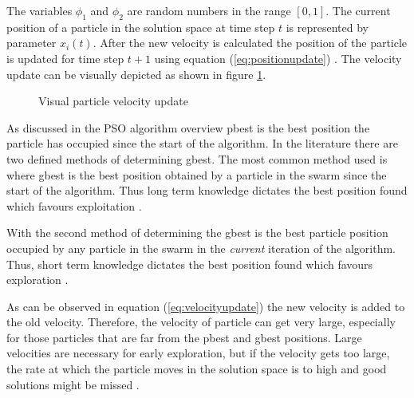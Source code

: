 The variables $\phi_1$ and $\phi_2$ are random numbers in the range $[0,1]$. The current position of a particle in the solution space at time step $t$ is represented by parameter $x_i(t)$\cite{FundamentalSwarm,CompuIntelligenceIntro}. After the new velocity is calculated the position of the particle is updated for time step $t+1$ using equation (\ref{eq:positionupdate}) \cite{FundamentalSwarm,CompuIntelligenceIntro}. The velocity update can be visually depicted as shown in figure \ref{fig:particleVelocityUpdate}. 
\begin{figure}[h]
	\begin{centering}
	
	\caption{Visual particle velocity update \cite{SOSwarm,FundamentalSwarm,CompuIntelligenceIntro,PSOSelfHierarch}}

	\label{fig:particleVelocityUpdate}
	\end{centering}
\end{figure}

As discussed in the PSO algorithm overview pbest is the best position the particle has occupied since the start of the algorithm. In the literature there are two defined methods of determining gbest. The most common method used is where gbest is the best position obtained by a particle in the swarm since the start of the algorithm. Thus long term knowledge dictates the best position found which favours exploitation \cite{CompuIntelligenceIntro,FundamentalSwarm}.

With the second method of determining the gbest is the best particle position occupied by any particle in the swarm in the \emph{current} iteration of the algorithm. Thus, short term knowledge dictates the best position found which favours exploration \cite{CompuIntelligenceIntro,FundamentalSwarm}.

As can be observed in equation (\ref{eq:velocityupdate}) the new velocity is added to the old velocity. Therefore, the velocity of particle can get very large, especially for those particles that are far from the pbest and gbest positions. Large velocities are necessary for early exploration, but if the velocity gets too large, the rate at which the particle moves in the solution space is to high and good solutions might be missed \cite{FundamentalSwarm}.

